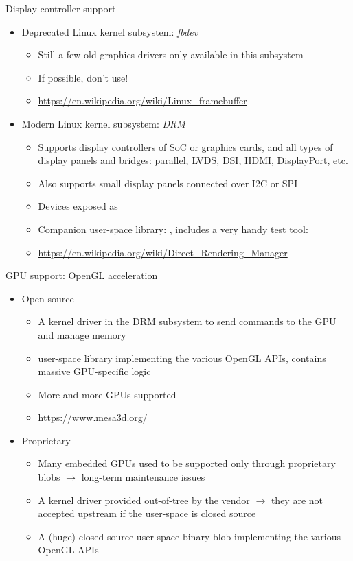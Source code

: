 \begin{frame}{Display controller support}
  \begin{itemize}
  \item Deprecated Linux kernel subsystem: {\em fbdev}
    \begin{itemize}
    \item Still a few old graphics drivers only available in this subsystem
    \item If possible, don't use!
    \item \url{https://en.wikipedia.org/wiki/Linux_framebuffer}
    \end{itemize}
  \item Modern Linux kernel subsystem: {\em DRM}
    \begin{itemize}
    \item Supports display controllers of SoC or graphics cards, and
      all types of display panels and bridges: parallel, LVDS, DSI,
      HDMI, DisplayPort, etc.
    \item Also supports small display panels connected over I2C or SPI
    \item Devices exposed as 
    \item Companion user-space library: , includes a very
      handy test tool: 
    \item \url{https://en.wikipedia.org/wiki/Direct_Rendering_Manager}
    \end{itemize}
  \end{itemize}
\end{frame}

\begin{frame}{GPU support: OpenGL acceleration}
  \begin{itemize}
  \item Open-source
    \begin{itemize}
    \item A kernel driver in the DRM subsystem to send commands to the
      GPU and manage memory
    \item {} user-space library implementing the various
      OpenGL APIs, contains massive GPU-specific logic
    \item More and more GPUs supported
    \item \url{https://www.mesa3d.org/}
    \end{itemize}
  \item Proprietary
    \begin{itemize}
    \item Many embedded GPUs used to be supported only through
      proprietary blobs $\rightarrow$ long-term maintenance issues
    \item A kernel driver provided out-of-tree by the vendor
      $\rightarrow$ they are not accepted upstream if the user-space
      is closed source
    \item A (huge) closed-source user-space binary blob implementing
      the various OpenGL APIs
    \end{itemize}
  \end{itemize}
\end{frame}

